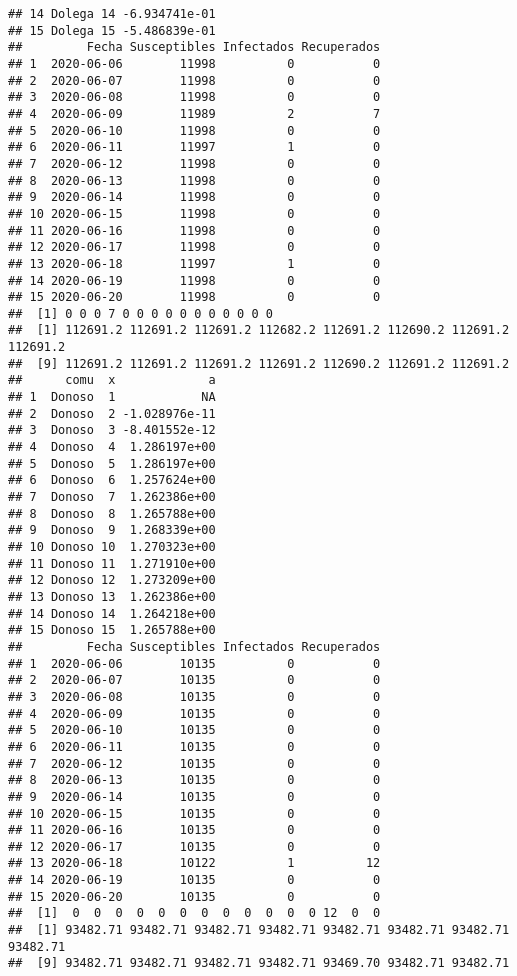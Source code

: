 \documentclass[
]{article}
\begin{document}
\begin{verbatim}
## 14 Dolega 14 -6.934741e-01
## 15 Dolega 15 -5.486839e-01
##         Fecha Susceptibles Infectados Recuperados
## 1  2020-06-06        11998          0           0
## 2  2020-06-07        11998          0           0
## 3  2020-06-08        11998          0           0
## 4  2020-06-09        11989          2           7
## 5  2020-06-10        11998          0           0
## 6  2020-06-11        11997          1           0
## 7  2020-06-12        11998          0           0
## 8  2020-06-13        11998          0           0
## 9  2020-06-14        11998          0           0
## 10 2020-06-15        11998          0           0
## 11 2020-06-16        11998          0           0
## 12 2020-06-17        11998          0           0
## 13 2020-06-18        11997          1           0
## 14 2020-06-19        11998          0           0
## 15 2020-06-20        11998          0           0
##  [1] 0 0 0 7 0 0 0 0 0 0 0 0 0 0 0
##  [1] 112691.2 112691.2 112691.2 112682.2 112691.2 112690.2 112691.2 112691.2
##  [9] 112691.2 112691.2 112691.2 112691.2 112690.2 112691.2 112691.2
##      comu  x             a
## 1  Donoso  1            NA
## 2  Donoso  2 -1.028976e-11
## 3  Donoso  3 -8.401552e-12
## 4  Donoso  4  1.286197e+00
## 5  Donoso  5  1.286197e+00
## 6  Donoso  6  1.257624e+00
## 7  Donoso  7  1.262386e+00
## 8  Donoso  8  1.265788e+00
## 9  Donoso  9  1.268339e+00
## 10 Donoso 10  1.270323e+00
## 11 Donoso 11  1.271910e+00
## 12 Donoso 12  1.273209e+00
## 13 Donoso 13  1.262386e+00
## 14 Donoso 14  1.264218e+00
## 15 Donoso 15  1.265788e+00
##         Fecha Susceptibles Infectados Recuperados
## 1  2020-06-06        10135          0           0
## 2  2020-06-07        10135          0           0
## 3  2020-06-08        10135          0           0
## 4  2020-06-09        10135          0           0
## 5  2020-06-10        10135          0           0
## 6  2020-06-11        10135          0           0
## 7  2020-06-12        10135          0           0
## 8  2020-06-13        10135          0           0
## 9  2020-06-14        10135          0           0
## 10 2020-06-15        10135          0           0
## 11 2020-06-16        10135          0           0
## 12 2020-06-17        10135          0           0
## 13 2020-06-18        10122          1          12
## 14 2020-06-19        10135          0           0
## 15 2020-06-20        10135          0           0
##  [1]  0  0  0  0  0  0  0  0  0  0  0  0 12  0  0
##  [1] 93482.71 93482.71 93482.71 93482.71 93482.71 93482.71 93482.71 93482.71
##  [9] 93482.71 93482.71 93482.71 93482.71 93469.70 93482.71 93482.71

\end{verbatim}
\end{document}
